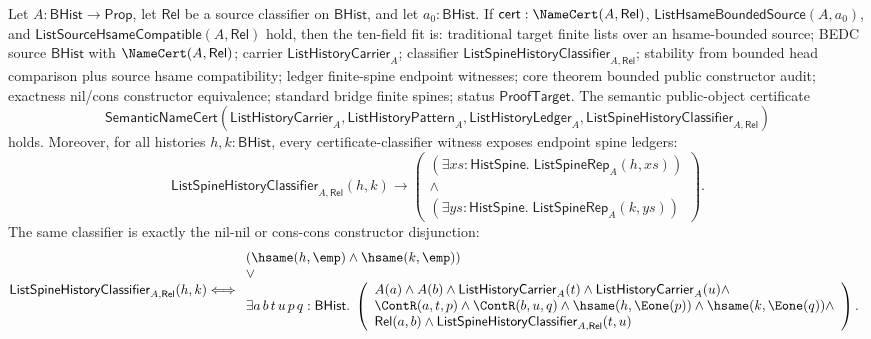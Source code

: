 \begin{theorem}
\label{thm:list-hsame-compatible-bounded-source-public-object-constructor-audit}
Let $A:\mathsf{BHist}\to\mathsf{Prop}$, let $\mathsf{Rel}$ be a source
classifier on $\mathsf{BHist}$, and let $a_0:\mathsf{BHist}$. If
$\mathsf{cert}:\NameCert(A,\mathsf{Rel})$,
$\mathsf{ListHsameBoundedSource}(A,a_0)$, and
$\mathsf{ListSourceHsameCompatible}(A,\mathsf{Rel})$ hold, then the ten-field fit
is: traditional target finite lists over an hsame-bounded source; BEDC source
$\mathsf{BHist}$ with $\NameCert(A,\mathsf{Rel})$; carrier
$\mathsf{ListHistoryCarrier}_A$; classifier
$\mathsf{ListSpineHistoryClassifier}_{A,\mathsf{Rel}}$; stability from bounded
head comparison plus source hsame compatibility; ledger finite-spine endpoint
witnesses; core theorem bounded public constructor audit; exactness nil/cons
constructor equivalence; standard bridge finite spines; status
$\mathsf{ProofTarget}$. The semantic public-object certificate
$$
\mathsf{SemanticNameCert}(\mathsf{ListHistoryCarrier}_A,
\mathsf{ListHistoryPattern}_A,
\mathsf{ListHistoryLedger}_A,
\mathsf{ListSpineHistoryClassifier}_{A,\mathsf{Rel}})
$$
holds. Moreover, for all histories $h,k:\mathsf{BHist}$, every
certificate-classifier witness exposes endpoint spine ledgers:
$$
\mathsf{ListSpineHistoryClassifier}_{A,\mathsf{Rel}}(h,k)
\to
\left(
\begin{array}{l}
(\exists xs:\mathsf{HistSpine}.\;\mathsf{ListSpineRep}_A(h,xs))\\
\land\\
(\exists ys:\mathsf{HistSpine}.\;\mathsf{ListSpineRep}_A(k,ys))
\end{array}
\right).
$$
The same classifier is exactly the nil-nil or cons-cons constructor
disjunction:
$$
\mathsf{ListSpineHistoryClassifier}_{A,\mathsf{Rel}}(h,k)
\Longleftrightarrow
\begin{array}{l}
(\hsame(h,\emp)\land \hsame(k,\emp))\\
\lor\\
\exists a\,b\,t\,u\,p\,q:\mathsf{BHist}.\;
\left(
\begin{array}{l}
A(a)\land A(b)\land
\mathsf{ListHistoryCarrier}_A(t)\land
\mathsf{ListHistoryCarrier}_A(u)\land\\
\ContR(a,t,p)\land \ContR(b,u,q)\land
\hsame(h,\Eone(p))\land \hsame(k,\Eone(q))\land\\
\mathsf{Rel}(a,b)\land
\mathsf{ListSpineHistoryClassifier}_{A,\mathsf{Rel}}(t,u)
\end{array}
\right).
\end{array}
$$
\end{theorem}

